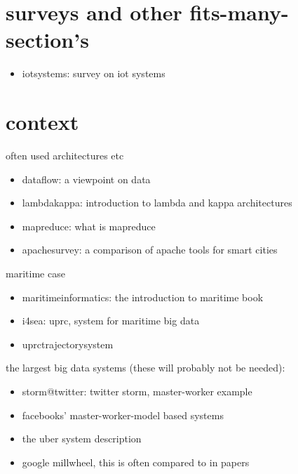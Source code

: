 \documentclass{article}
\begin{document}


\chapter{surveys and other fits-many-section's}

\begin{itemize}
    \item \cite{iotsystems} iotsystems: survey on iot systems
\end{itemize}

\chapter{context}

often used architectures etc

\begin{itemize}
    \item \cite{dataflow} dataflow: a viewpoint on data
    \item \cite{lambdakappa} lambdakappa: introduction to lambda and kappa architectures
    \item \cite{mapreduce} mapreduce: what is mapreduce
    \item \cite{apachesurvey} apachesurvey: a comparison of apache tools for smart cities
\end{itemize}

maritime case

\begin{itemize}
    \item \cite{maritimeinformatics} maritimeinformatics: the introduction to maritime book
     \item \cite{i4sea} i4sea: uprc, system for maritime big data
     \item \cite{uprctrajectorysystem} uprctrajectorysystem
\end{itemize}

the largest big data systems (these will probably not be needed):

\begin{itemize}
    \item \cite{storm@twitter} storm@twitter: twitter storm, master-worker example
    \item \cite{facebook} facebooks' master-worker-model based systems
    \item \cite{uber} the uber system description
    \item \cite{millwheel} google millwheel, this is often compared to in papers 
\end{itemize} 
\end{document}
